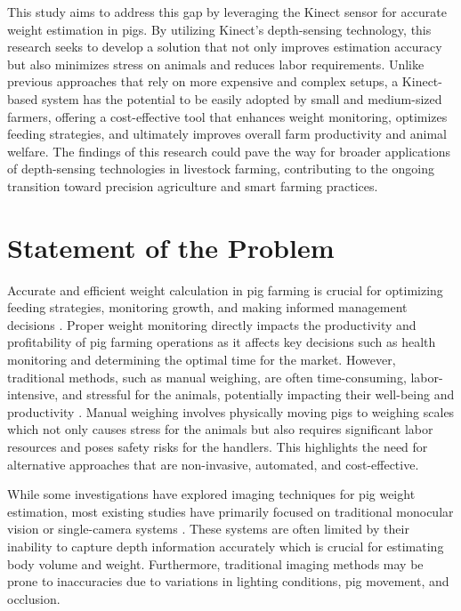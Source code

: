{This study aims to address this gap by leveraging the Kinect sensor for accurate weight estimation in pigs. By utilizing Kinect's depth-sensing technology, this research seeks to develop a solution that not only improves estimation accuracy but also minimizes stress on animals and reduces labor requirements. Unlike previous approaches that rely on more expensive and complex setups, a Kinect-based system has the potential to be easily adopted by small and medium-sized farmers, offering a cost-effective tool that enhances weight monitoring, optimizes feeding strategies, and ultimately improves overall farm productivity and animal welfare. The findings of this research could pave the way for broader applications of depth-sensing technologies in livestock farming, contributing to the ongoing transition toward precision agriculture and smart farming practices.
 


\section{Statement of the Problem}

Accurate and efficient weight calculation in pig farming is crucial for optimizing feeding strategies, monitoring growth, and making informed management decisions \citep{pezzuolo2018barn}. Proper weight monitoring directly impacts the productivity and profitability of pig farming operations as it affects key decisions such as health monitoring and determining the optimal time for the market. However, traditional methods, such as manual weighing, are often time-consuming, labor-intensive, and stressful for the animals, potentially impacting their well-being and productivity \citep{li2014estimation}. Manual weighing involves physically moving pigs to weighing scales which not only causes stress for the animals but also requires significant labor resources and poses safety risks for the handlers. This highlights the need for alternative approaches that are non-invasive, automated, and cost-effective.

While some investigations have explored imaging techniques for pig weight estimation, most existing studies have primarily focused on traditional monocular vision or single-camera systems \citep{pezzuolo2018barn}\citep{kollis2007weight}. These systems are often limited by their inability to capture depth information accurately which is crucial for estimating body volume and weight. Furthermore, traditional imaging methods may be prone to inaccuracies due to variations in lighting conditions, pig movement, and occlusion.

}

